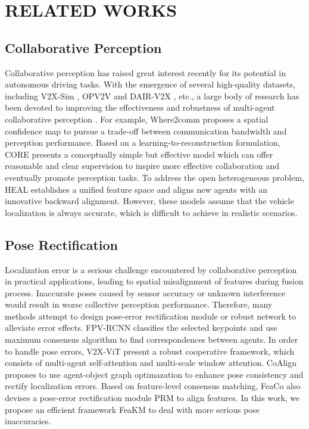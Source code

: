 \section{RELATED WORKS}
\subsection{Collaborative Perception}
    Collaborative perception has raised great interest recently for its potential in autonomous driving tasks. With the emergence of several high-quality datasets, including V2X-Sim \cite{V2X-Sim}, OPV2V \cite{OPV2V} and DAIR-V2X \cite{DAIR-V2X}, etc., a large body of research has been devoted to improving the effectiveness and robustness of multi-agent collaborative perception \cite{CoCa3D,  Where2comm, CORE, HEAL}. For example, Where2comm \cite{Where2comm} proposes a spatial confidence map to pursue a trade-off between communication bandwidth and perception performance. Based on a learning-to-reconstruction formulation, CORE \cite{CORE} presents a conceptually simple but effective model which can offer reasonable and clear supervision to inspire more effective collaboration and eventually promote perception tasks. To address the open heterogeneous problem, HEAL \cite{HEAL} establishes a unified feature space and aligns new agents with an innovative backward alignment. However, these models assume that the vehicle localization is always accurate, which is difficult to achieve in realistic scenarios.

\subsection{Pose Rectification}
    Localization error is a serious challenge encountered by collaborative perception in practical applications, leading to spatial misalignment of features during fusion process. Inaccurate poses caused by sensor accuracy or unknown interference would result in worse collective perception performance. Therefore, many methods attempt to design pose-error rectification module or robust network to alleviate error effects. FPV-RCNN \cite{fpvrcnn} classifies the selected keypoints and use maximum consensus algorithm to find correspondences between agents. In order to handle pose errors, V2X-ViT \cite{v2xvit} present a robust cooperative framework, which consists of multi-agent self-attention and multi-scale window attention. CoAlign \cite{CoAlign} proposes to use agent-object graph optimazation to enhance pose consistency and rectify localization errors. Based on feature-level consensus matching, FeaCo \cite{FeaCo} also devises a pose-error rectification module PRM to align features. In this work, we propose an efficient framework FeaKM to deal with more serious pose inaccuracies.

